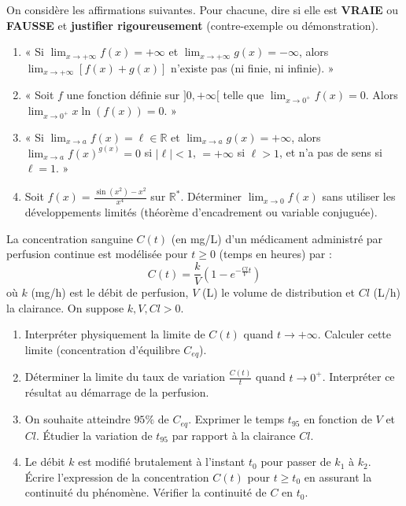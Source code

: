 \documentclass[11pt]{article}
\begin{document}
\begin{exercice}
On considère les affirmations suivantes. Pour chacune, dire si elle est \textbf{VRAIE} ou \textbf{FAUSSE} et \textbf{justifier rigoureusement} (contre-exemple ou démonstration).
\begin{enumerate}
    \item « Si $\lim_{x \to +\infty} f(x) = +\infty$ et $\lim_{x \to +\infty} g(x) = -\infty$, alors $\lim_{x \to +\infty} [f(x) + g(x)]$ n'existe pas (ni finie, ni infinie). »
    \item « Soit $f$ une fonction définie sur $]0, +\infty[$ telle que $\lim_{x \to 0^+} f(x) = 0$. Alors $\lim_{x \to 0^+} x \ln(f(x)) = 0$. »
    \item « Si $\lim_{x \to a} f(x) = \ell \in \mathbb{R}$ et $\lim_{x \to a} g(x) = +\infty$, alors $\lim_{x \to a} f(x)^{g(x)} = 0$ si $|\ell| < 1$, $= +\infty$ si $\ell > 1$, et n'a pas de sens si $\ell = 1$. »
    \item Soit $f(x) = \frac{\sin(x^2) - x^2}{x^4}$ sur $\mathbb{R}^*$. Déterminer $\lim_{x \to 0} f(x)$ sans utiliser les développements limités (théorème d'encadrement ou variable conjuguée).
\end{enumerate}
\end{exercice}

\begin{exercice}
La concentration sanguine $C(t)$ (en mg/L) d'un médicament administré par perfusion continue est modélisée pour $t \geq 0$ (temps en heures) par :
$$ C(t) = \frac{k}{V} \left( 1 - e^{-\frac{Cl}{V}t} \right) $$
où $k$ (mg/h) est le débit de perfusion, $V$ (L) le volume de distribution et $Cl$ (L/h) la clairance. On suppose $k, V, Cl > 0$.
\begin{enumerate}
    \item Interpréter physiquement la limite de $C(t)$ quand $t \to +\infty$. Calculer cette limite (concentration d'équilibre $C_{eq}$).
    \item Déterminer la limite du taux de variation $\frac{C(t)}{t}$ quand $t \to 0^+$. Interpréter ce résultat au démarrage de la perfusion.
    \item On souhaite atteindre $95\%$ de $C_{eq}$. Exprimer le temps $t_{95}$ en fonction de $V$ et $Cl$. Étudier la variation de $t_{95}$ par rapport à la clairance $Cl$.
    \item Le débit $k$ est modifié brutalement à l'instant $t_0$ pour passer de $k_1$ à $k_2$. Écrire l'expression de la concentration $C(t)$ pour $t \geq t_0$ en assurant la continuité du phénomène. Vérifier la continuité de $C$ en $t_0$.
\end{enumerate}
\end{exercice}
\end{document}
